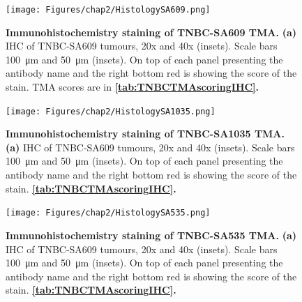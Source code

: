  \begin{figure}
\centering
\texttt{[image: Figures/chap2/HistologySA609.png]}
	
\caption[]
	{\small
\textbf{Immunohistochemistry staining of TNBC-SA609 TMA.}
 \textbf{(a)} IHC of TNBC-SA609 tumours, 20x and 40x (insets). Scale bars \SI{100}{\micro\metre} and \SI{50}{\micro\metre} (insets). On top of each panel presenting the antibody name and the right bottom red is showing the score of the stain. TMA scores are in \textbf{\autoref{tab:TNBCTMAscoringIHC}.}}
	\label{fig:HistologySA609}
\end{figure}

 \begin{figure}
\centering
\texttt{[image: Figures/chap2/HistologySA1035.png]}
	
\caption[]
	{\small
\textbf{Immunohistochemistry staining of TNBC-SA1035 TMA.}
 \textbf{(a)} IHC of TNBC-SA609 tumours, 20x and 40x (insets). Scale bars \SI{100}{\micro\metre} and \SI{50}{\micro\metre} (insets). On top of each panel presenting the antibody name and the right bottom red is showing the score of the stain. \textbf{\autoref{tab:TNBCTMAscoringIHC}.}}
	\label{fig:HistologySA1035}
\end{figure}

 \begin{figure}
\centering
\texttt{[image: Figures/chap2/HistologySA535.png]}
	
\caption[]
	{\small
\textbf{Immunohistochemistry staining of TNBC-SA535 TMA.}
 \textbf{(a)} IHC of TNBC-SA609 tumours, 20x and 40x (insets). Scale bars \SI{100}{\micro\metre} and \SI{50}{\micro\metre} (insets). On top of each panel presenting the antibody name and the right bottom red is showing the score of the stain. \textbf{\autoref{tab:TNBCTMAscoringIHC}.}}
	\label{fig:HistologySA535}
\end{figure}


